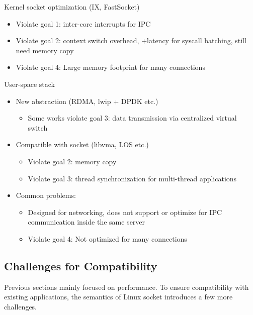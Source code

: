 Kernel socket optimization (IX, FastSocket) 

\begin{itemize}
\item
Violate goal 1: inter-core interrupts for IPC 
\item
Violate goal 2: context switch overhead, +latency for syscall batching, still need memory copy 
\item 
Violate goal 4: Large memory footprint for many connections 
\end{itemize}

User-space stack 

\begin{itemize}
\item New abstraction (RDMA, lwip + DPDK etc.) 
\begin{itemize}
	\item Some works violate goal 3: data transmission via centralized virtual switch 
\end{itemize}
\item Compatible with socket (libvma, LOS etc.) 
\begin{itemize}
	\item Violate goal 2: memory copy 
	\item Violate goal 3: thread synchronization for multi-thread applications 
\end{itemize}
\item Common problems: 
\begin{itemize}
	\item Designed for networking, does not support or optimize for IPC communication inside the same server 
	\item Violate goal 4: Not optimized for many connections 
\end{itemize}
\end{itemize}



\subsection{Challenges for Compatibility}
\label{subsec:challenges}

Previous sections mainly focused on performance. To ensure compatibility with existing applications, the semantics of Linux socket introduces a few more challenges.


